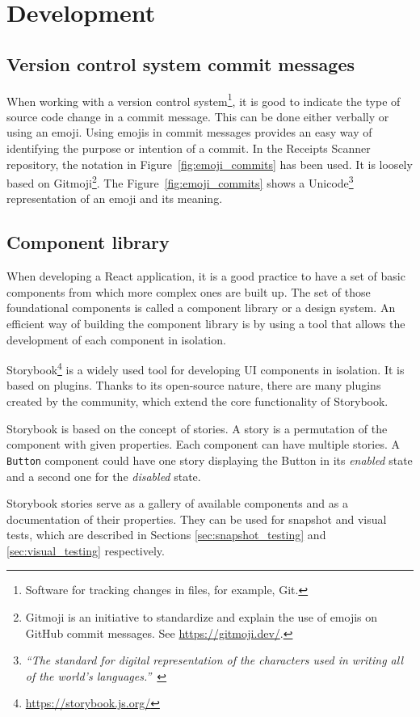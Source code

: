 \documentclass[
  digital, %
  table,   %
  oneside, %
  lof,     %
  lot,     %
]{fithesis3}
\begin{document}
\chapter{Development}
\section{Version control system commit messages}
When working with a version control system\footnote{Software for tracking changes in files, for example, Git.}, it is good to indicate the type of source code change in a commit message. This can be done either verbally or using an emoji.
Using emojis in commit messages provides an easy way of identifying the purpose or intention of a commit. In the Receipts Scanner repository, the notation in Figure~\ref{fig:emoji_commits} has been used. It is loosely based on Gitmoji\footnote{Gitmoji is an initiative to standardize and explain the use of emojis on GitHub commit messages. See \url{https://gitmoji.dev/}.}. The Figure~\ref{fig:emoji_commits} shows a Unicode\footnote{\textit{``The standard for digital representation of the characters used in writing all of the world's languages.''}~\cite{Unicode}} representation of an emoji and its meaning.

\section{Component library}
\label{sec:component_library}
When developing a React application, it is a good practice to have a set of basic components from which more complex ones are built up. The set of those foundational components is called a component library or a design system. An efficient way of building the component library is by using a tool that allows the development of each component in isolation. 

Storybook\footnote{\url{https://storybook.js.org/}} is a widely used tool for developing UI components in isolation. It is based on plugins. Thanks to its open-source nature, there are many plugins created by the community, which extend the core functionality of Storybook.

Storybook is based on the concept of stories. A story is a permutation of the component with given properties. Each component can have multiple stories. A \texttt{Button} component could have one story displaying the Button in its \textit{enabled} state and a second one for the \textit{disabled} state.

Storybook stories serve as a gallery of available components and as a documentation of their properties. They can be used for snapshot and visual tests, which are described in Sections \ref{sec:snapshot_testing} and \ref{sec:visual_testing} respectively.
\end{document}

